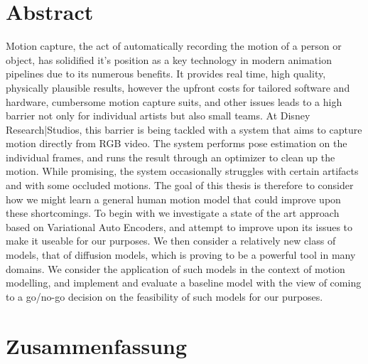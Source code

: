 \chapter*{Abstract}

Motion capture, the act of automatically recording the motion of a person or object, has solidified it's position as a key technology in modern animation pipelines due to its numerous benefits. It provides real time, high quality, physically plausible results, however the upfront costs for tailored software and hardware, cumbersome motion capture suits, and other issues leads to a high barrier not only for individual artists but also small teams. At Disney Research|Studios, this barrier is being tackled with a system that aims to capture motion directly from RGB video. The system performs pose estimation on the individual frames, and runs the result through an optimizer to clean up the motion. While promising, the system occasionally struggles with certain artifacts and with some occluded motions. The goal of this thesis is therefore to consider how we might learn a general human motion model that could improve upon these shortcomings. To begin with we investigate a state of the art approach based on Variational Auto Encoders, and attempt to improve upon its issues to make it useable for our purposes. We then consider a relatively new class of models, that of diffusion models, which is proving to be a powerful tool in many domains. We consider the application of such models in the context of motion modelling, and implement and evaluate a baseline model with the view of coming to a go/no-go decision on the feasibility of such models for our purposes.
 
\cleardoublepage
\chapter*{Zusammenfassung}

